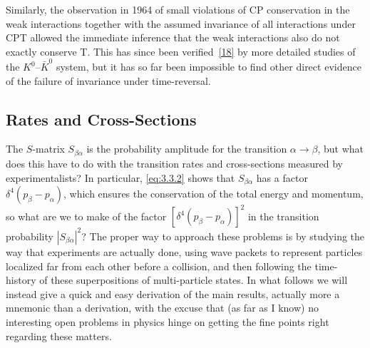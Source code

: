 Similarly, the observation in 1964 of small violations of CP conservation in the weak
interactions together with the assumed invariance of all interactions under CPT allowed the
immediate inference that the weak interactions also do not exactly conserve T. This has since
been verified~\hyperref[ref:3.18]{[18]} by more detailed studies of the $K^0$--$\bar K^0$ system, but it has so far
been impossible to find other direct evidence of the failure of invariance under time-reversal.

\subsection{Rates and Cross-Sections}

The $S$-matrix $S_{\beta\alpha}$ is the probability amplitude for the transition
$\alpha\to\beta$, but what does this have to do with the transition rates and cross-sections
measured by experimentalists? In particular, \eqref{eq:3.3.2} shows that $S_{\beta\alpha}$ has
a factor $\delta^4(p_\beta-p_\alpha)$, which ensures the conservation of the total energy
and momentum, so what are we to make of the factor $[\delta^4(p_\beta-p_\alpha)]^2$
in the transition probability $|S_{\beta\alpha}|^2$? The proper way to approach these
problems is by studying the way that experiments are actually done, using wave packets
to represent particles localized far from each other before a collision, and then following
the time-history of these superpositions of multi-particle states. In what follows we will
instead give a quick and easy derivation of the main results, actually more a mnemonic than
a derivation, with the excuse that (as far as I know) no interesting open problems in physics
hinge on getting the fine points right regarding these matters.


